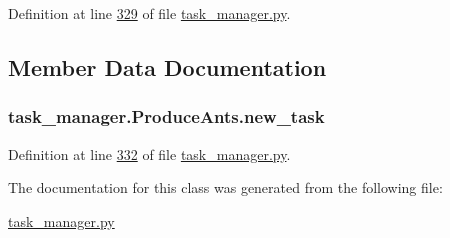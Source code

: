 Definition at line \hyperlink{task__manager_8py_source_l00329}{329} of file \hyperlink{task__manager_8py_source}{task\+\_\+manager.\+py}.



\subsection{Member Data Documentation}
\hypertarget{classtask__manager_1_1ProduceAnts_a52f38a28435526dc06a11cd23916ee4b}{
\subsubsection[{new\+\_\+task}]{\setlength{\rightskip}{0pt plus 5cm}task\+\_\+manager.\+Produce\+Ants.\+new\+\_\+task}}\label{classtask__manager_1_1ProduceAnts_a52f38a28435526dc06a11cd23916ee4b}


Definition at line \hyperlink{task__manager_8py_source_l00332}{332} of file \hyperlink{task__manager_8py_source}{task\+\_\+manager.\+py}.



The documentation for this class was generated from the following file\+:\begin{DoxyCompactItemize}
\item 
\hyperlink{task__manager_8py}{task\+\_\+manager.\+py}\end{DoxyCompactItemize}
